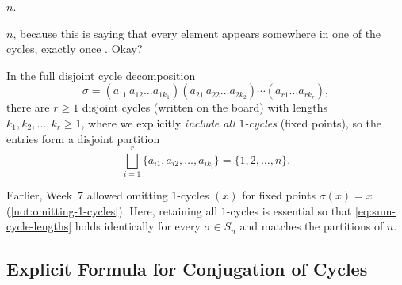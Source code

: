 \begin{student}
$n$.
\end{student}

\begin{speech}[00:33:24 - 00:33:35]
$n$, because this is saying that every element appears somewhere in one of the cycles, exactly once . Okay?
\end{speech}

\begin{content}
In the full disjoint cycle decomposition
\begin{equation}\label{eq:full-cycle-decomp}
\sigma = (a_{11}\, a_{12} \dots a_{1 k_1})(a_{21}\, a_{22} \dots a_{2 k_2}) \cdots (a_{r1} \dots a_{r k_r}),
\end{equation}
there are $r \ge 1$ disjoint cycles (written  on the board) with lengths $k_1, k_2, \dots, k_r \ge 1$, where we explicitly \emph{include all $1$-cycles} (fixed points), so the entries form a disjoint partition
\begin{equation}\label{eq:disjoint-union-elements}
\bigsqcup_{i=1}^r \{a_{i1}, a_{i2}, \dots, a_{i k_i}\} = \{1, 2, \dots, n\}.
\end{equation}


\begin{steps}
Earlier, Week~7 allowed omitting $1$-cycles $(x)$ for fixed points $\sigma(x) = x$ (\cref{not:omitting-1-cycles}). Here, retaining all $1$-cycles is essential so that \eqref{eq:sum-cycle-lengths} holds identically for every $\sigma \in S_n$ and matches the partitions of $n$.
\end{steps}
\end{content}

\subsection{Explicit Formula for Conjugation of Cycles}


